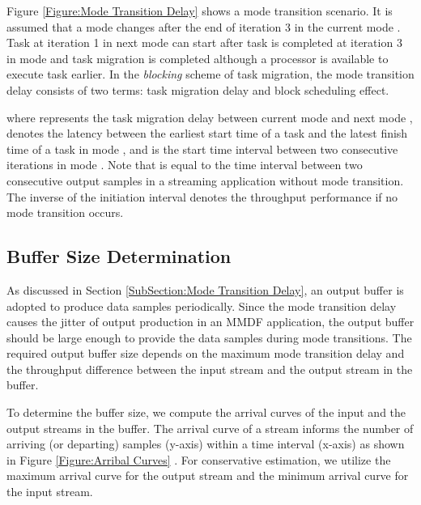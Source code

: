\documentclass[prodmode,acmtecs]{acmsmall}
\begin{document}
Figure \ref{Figure:Mode Transition Delay} shows a mode transition scenario. It is assumed that a mode changes after the end of iteration 3 in the current mode . Task  at iteration 1 in next mode  can start after task  is completed at iteration 3 in mode  and task migration is completed although a processor is available to execute task  earlier. In the \textit{blocking} scheme of task migration, the mode transition delay consists of two terms: task migration delay and block scheduling effect.

\begin{definition}
\label{Definition:Mode Transition Delay}

\end{definition}

where  represents the task migration delay between current mode  and  next mode ,  denotes the latency between the earliest start time of a task and the latest finish time of a task in mode , and  is the start time interval between two consecutive iterations in mode . Note that  is equal to the time interval between two consecutive output samples in a streaming application without mode transition. The inverse of the initiation interval denotes the throughput performance if no mode transition occurs.

\subsection{Buffer Size Determination}
\label{SubSection:Buffer Size Determination}

As discussed in Section \ref{SubSection:Mode Transition Delay}, an output buffer is adopted to produce data samples periodically. Since the mode transition delay causes the jitter of output production in an MMDF application, the output buffer should be large enough to provide the data samples during mode transitions. The required output buffer size depends on the maximum mode transition delay and the throughput difference between the input stream and the output stream in the buffer.

To determine the buffer size, we compute the arrival curves of the input and the output streams in the buffer. The arrival curve of a stream informs the number of arriving (or departing) samples (y-axis) within a time interval (x-axis) as shown in Figure \ref{Figure:Arribal Curves} \cite{Thiele:2000}. For conservative estimation, we utilize the maximum arrival curve for the output stream and the minimum arrival curve for the input stream.
\end{document}
